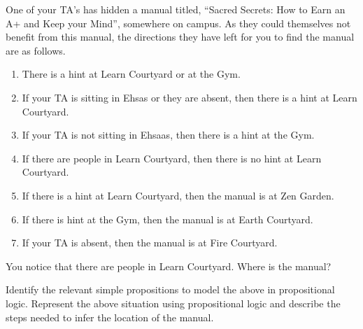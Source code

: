 \documentclass[addpoints]{exam}
\begin{document}
\begin{questions}

\question[5] One of your TA's has hidden a manual titled, ``Sacred Secrets: How to Earn an A+ and Keep your Mind'', somewhere on campus. As they could themselves not benefit from this manual, the directions they have left for you to find the manual are as follows.
  \begin{enumerate}
  \item There is a hint at Learn Courtyard or at the Gym.
  \item If your TA is sitting in Ehsas or they are absent, then there is a hint at Learn Courtyard.
  \item If your TA is not sitting in Ehsaas, then there is a hint at the Gym.
  \item If there are people in Learn Courtyard, then there is no hint at Learn Courtyard.
  \item If there is a hint at Learn Courtyard, then the manual is at Zen Garden.
  \item If there is hint at the Gym, then the manual is at Earth Courtyard.
  \item If your TA is absent, then the manual is at Fire Courtyard.
  \end{enumerate}
  You notice that there are people in Learn Courtyard. Where is the manual?

  Identify the relevant simple propositions to model the above in propositional logic. Represent the above situation using propositional logic and describe the steps needed to infer the location of the manual.
  \begin{solution}
  \end{solution}


\end{questions}
\end{document}
